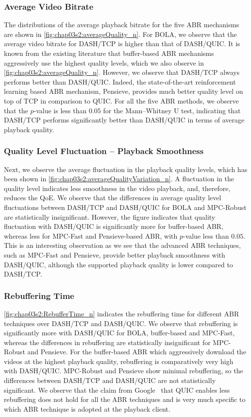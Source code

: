 \subsubsection{Average Video Bitrate}
The distributions of the average playback bitrate for the five ABR mechanisms are shown in \fig\ref{fig:chap03s2:averageQuality_n}. For BOLA, we observe that the average video bitrate for DASH/TCP is higher than that of DASH/QUIC. It is known from the existing literature that buffer-based ABR mechanisms aggressively use the highest quality levels, which we also observe in \fig\ref{fig:chap03s2:averageQuality_n}. However, we observe that DASH/TCP always performs better than DASH/QUIC. Indeed, the state-of-the-art reinforcement learning based ABR mechanism, Pensieve, provides much better quality level on top of TCP in comparison to QUIC. For all the five ABR methods, we observe that the $p$-value is less than $0.05$ for the Mann–Whitney U test, indicating that DASH/TCP performs significantly better than DASH/QUIC in terms of average playback quality.

\subsubsection{Quality Level Fluctuation -- Playback Smoothness}
Next, we observe the average fluctuation in the playback quality levels, which has been shown in \fig\ref{fig:chap03s2:averageQualityVariation_n}. A fluctuation in the quality level indicates less smoothness in the video playback, and, therefore, reduces the QoE. We observe that the differences in average quality level fluctuations between DASH/TCP and DASH/QUIC for BOLA and MPC-Robust are statistically insignificant. However, the figure indicates that quality fluctuation with DASH/QUIC is significantly more for buffer-based ABR, whereas less for MPC-Fast and Pensieve-based ABR, with $p$-value less than $0.05$. This is an interesting observation as we see that the advanced ABR techniques, such as MPC-Fast and Pensieve, provide better playback smoothness with DASH/QUIC, although the supported playback quality is lower compared to DASH/TCP. 


\subsubsection{Rebuffering Time}
\fig\ref{fig:chap03s2:RebufferTime_n} indicates the rebuffering time for different ABR techniques over DASH/TCP and DASH/QUIC. We observe that rebuffering is significantly more with DASH/QUIC for BOLA, buffer-based and MPC-Fast, whereas the differences in rebuffering are statistically insignificant for MPC-Robust and Pensieve. For the buffer-based ABR which aggressively download the videos at the highest playback quality, rebuffering is comparatively very high with DASH/QUIC. MPC-Robust and Pensieve show minimal rebuffering, so the differences between DASH/TCP and DASH/QUIC are not statistically significant. We observe that the claim from Google~\cite{langley2017quic} that QUIC enables less rebuffering does not hold for all the ABR techniques and is very much specific to which ABR technique is adopted at the playback client.  


